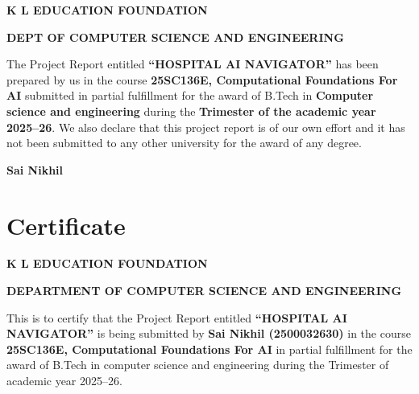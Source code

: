 \documentclass[12pt,a4paper]{report}
\begin{document}
\begin{center}

\vspace{0.3cm}
{\large\bfseries K L EDUCATION FOUNDATION\par}
\vspace{0.2cm}
{\bfseries DEPT OF COMPUTER SCIENCE AND ENGINEERING\par}
\end{center}

\vspace{0.5cm}

The Project Report entitled \textbf{``HOSPITAL AI NAVIGATOR''} has been prepared by us in the course \textbf{25SC136E, Computational Foundations For AI} submitted in partial fulfillment for the award of B.Tech in \textbf{Computer science and engineering} during the \textbf{Trimester of the academic year 2025--26}. We also declare that this project report is of our own effort and it has not been submitted to any other university for the award of any degree.

\vspace{2cm}

\textbf{Sai Nikhil}

\newpage

\chapter*{Certificate}

\begin{center}

\vspace{0.3cm}
{\large\bfseries K L EDUCATION FOUNDATION\par}
\vspace{0.2cm}
{\bfseries DEPARTMENT OF COMPUTER SCIENCE AND ENGINEERING\par}
\end{center}

\vspace{0.5cm}

This is to certify that the Project Report entitled \textbf{``HOSPITAL AI NAVIGATOR''} is being submitted by \textbf{Sai Nikhil (2500032630)} in the course \textbf{25SC136E, Computational Foundations For AI} in partial fulfillment for the award of B.Tech in computer science and engineering during the Trimester of academic year 2025--26.
\end{document}
